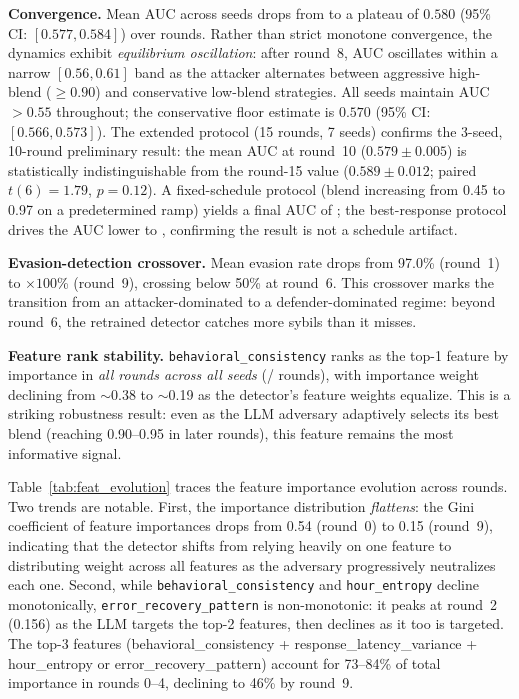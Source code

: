 \documentclass[sigconf,nonacm=false]{acmart}
\begin{document}
\textbf{Convergence.} Mean AUC across \bestResponseNSeeds{} seeds drops from \bestResponseInitialAucMean{} to a plateau of $0.580$ (95\% CI: $[0.577, 0.584]$) over \bestResponseNRounds{} rounds. Rather than strict monotone convergence, the dynamics exhibit \emph{equilibrium oscillation}: after round~8, AUC oscillates within a narrow $[0.56, 0.61]$ band as the attacker alternates between aggressive high-blend ($\geq 0.90$) and conservative low-blend strategies. All \bestResponseNSeeds{} seeds maintain AUC $> 0.55$ throughout; the conservative floor estimate is $0.570$ (95\% CI: $[0.566, 0.573]$).
The extended protocol (15 rounds, 7 seeds) confirms the 3-seed, 10-round preliminary result: the mean AUC at round~10 ($0.579 \pm 0.005$) is statistically indistinguishable from the round-15 value ($0.589 \pm 0.012$; paired $t(6) = 1.79$, $p = 0.12$).
A fixed-schedule protocol (blend increasing from 0.45 to 0.97 on a predetermined ramp) yields a final AUC of \equilibriumFinalAuc{}; the best-response protocol drives the AUC lower to \bestResponseAucFloorMean{}, confirming the result is not a schedule artifact.

\textbf{Evasion-detection crossover.} Mean evasion rate drops from 97.0\% (round~1) to \bestResponseFinalEvasionRateMean{}$\times 100$\% (round~9), crossing below 50\% at round~6. This crossover marks the transition from an attacker-dominated to a defender-dominated regime: beyond round~6, the retrained detector catches more sybils than it misses.

\textbf{Feature rank stability.} \texttt{behavioral\_consistency} ranks as the top-1 feature by importance in \textit{all \bestResponseNRounds{} rounds across all \bestResponseNSeeds{} seeds} (\behavioralConsistencyTopInNRounds{}/\behavioralConsistencyTopTotalRounds{} rounds), with importance weight declining from $\sim$0.38 to $\sim$0.19 as the detector's feature weights equalize. This is a striking robustness result: even as the LLM adversary adaptively selects its best blend (reaching 0.90--0.95 in later rounds), this feature remains the most informative signal.

Table~\ref{tab:feat_evolution} traces the feature importance evolution across rounds.
Two trends are notable.
First, the importance distribution \textit{flattens}: the Gini coefficient of feature importances drops from 0.54 (round~0) to 0.15 (round~9), indicating that the detector shifts from relying heavily on one feature to distributing weight across all features as the adversary progressively neutralizes each one.
Second, while \texttt{behavioral\_consistency} and \texttt{hour\_entropy} decline monotonically, \texttt{error\_recovery\_pattern} is non-monotonic: it peaks at round~2 (0.156) as the LLM targets the top-2 features, then declines as it too is targeted.
The top-3 features (behavioral\_consistency + response\_latency\_variance + hour\_entropy or error\_recovery\_pattern) account for 73--84\% of total importance in rounds 0--4, declining to 46\% by round~9.
\end{document}
